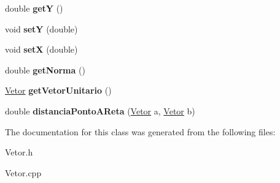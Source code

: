 \begin{DoxyCompactItemize}
\item 
\hypertarget{classVetor_ab5e48731d00fdedac420185453531e81}{double {\bfseries get\-Y} ()}\label{classVetor_ab5e48731d00fdedac420185453531e81}

\item 
\hypertarget{classVetor_a403b16158cbc13da87d301c64097c0e0}{void {\bfseries set\-Y} (double)}\label{classVetor_a403b16158cbc13da87d301c64097c0e0}

\item 
\hypertarget{classVetor_a68292db937545009a2cfc3187f3575b2}{void {\bfseries set\-X} (double)}\label{classVetor_a68292db937545009a2cfc3187f3575b2}

\item 
\hypertarget{classVetor_a6d7f1b6e44a489565d82fa15170053a8}{double {\bfseries get\-Norma} ()}\label{classVetor_a6d7f1b6e44a489565d82fa15170053a8}

\item 
\hypertarget{classVetor_a72dc7c4f3d0e32c876b1708a5e09242f}{\hyperlink{classVetor}{\-Vetor} {\bfseries get\-Vetor\-Unitario} ()}\label{classVetor_a72dc7c4f3d0e32c876b1708a5e09242f}

\item 
\hypertarget{classVetor_a7ea3317d99d56fd6f6ce464efdc4b322}{double {\bfseries distancia\-Ponto\-A\-Reta} (\hyperlink{classVetor}{\-Vetor} a, \hyperlink{classVetor}{\-Vetor} b)}\label{classVetor_a7ea3317d99d56fd6f6ce464efdc4b322}

\end{DoxyCompactItemize}


\-The documentation for this class was generated from the following files\-:\begin{DoxyCompactItemize}
\item 
\-Vetor.\-h\item 
\-Vetor.\-cpp\end{DoxyCompactItemize}
